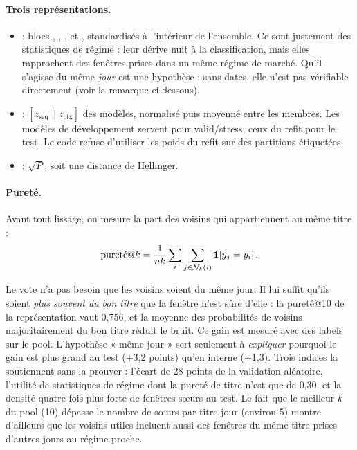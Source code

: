 \paragraph{Trois représentations.}
\begin{itemize}
\item {} : blocs , , ,  et , standardisés à l'intérieur de l'ensemble. Ce sont justement des statistiques de régime : leur dérive nuit à la classification, mais elles rapprochent des fenêtres prises dans un même régime de marché. Qu'il s'agisse du même \emph{jour} est une hypothèse : sans dates, elle n'est pas vérifiable directement (voir la remarque ci-dessous).
\item {} : $[z_{\text{seq}}\|z_{\text{ctx}}]$ des modèles, normalisé puis moyenné entre les membres. Les modèles de développement servent pour valid/stress, ceux du refit pour le test. Le code refuse d'utiliser les poids du refit sur des partitions étiquetées.
\item {} : $\sqrt{P}$, soit une distance de Hellinger.
\end{itemize}

\paragraph{Pureté.} Avant tout lissage, on mesure la part des voisins qui appartiennent au même titre :
\begin{equation}
\text{pureté}@k=\frac1{nk}\sum_i\sum_{j\in\mathcal{N}_k(i)}\mathbf{1}\!\left[y_j=y_i\right].
\end{equation}

\begin{remarque}
Le vote n'a pas besoin que les voisins soient du même jour. Il lui suffit qu'ils soient \emph{plus souvent du bon titre} que la fenêtre n'est sûre d'elle : la pureté@10 de la représentation  vaut 0,756, et la moyenne des probabilités de voisins majoritairement du bon titre réduit le bruit. Ce gain est mesuré avec des labels sur le pool. L'hypothèse « même jour » sert seulement à \emph{expliquer} pourquoi le gain est plus grand au test (+3,2 points) qu'en interne (+1,3). Trois indices la soutiennent sans la prouver : l'écart de 28 points de la validation aléatoire, l'utilité de statistiques de régime dont la pureté de titre n'est que de 0,30, et la densité quatre fois plus forte de fenêtres sœurs au test. Le fait que le meilleur $k$ du pool (10) dépasse le nombre de sœurs par titre-jour (environ 5) montre d'ailleurs que les voisins utiles incluent aussi des fenêtres du même titre prises d'autres jours au régime proche.
\end{remarque}

